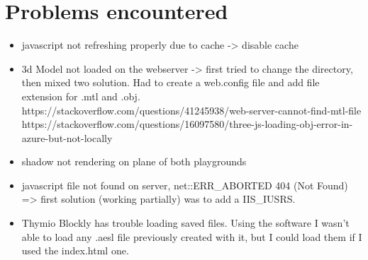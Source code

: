 \documentclass{scrartcl}
\begin{document}
\listoffigures

\listoftables

\section{Problems encountered}
\begin{itemize}
  \item javascript not refreshing properly due to cache -> disable cache
  \item 3d Model not loaded on the webserver -> first tried to change the directory, then mixed two solution. 
        Had to create a web.config file and add file extension for .mtl and .obj.
        https://stackoverflow.com/questions/41245938/web-server-cannot-find-mtl-file
        https://stackoverflow.com/questions/16097580/three-js-loading-obj-error-in-azure-but-not-locally
  \item shadow not rendering on plane of both playgrounds
  \item javascript file not found on server, net::ERR_ABORTED 404 (Not Found) => first solution (working partially) was to add a IIS_IUSRS.
  \item Thymio Blockly has trouble loading saved files. Using the software I wasn't able to load any .aesl file previously created with it, but I could load them if I used the index.html one.
\end{itemize}

\printbibliography[heading=bibintoc]
\end{document}
